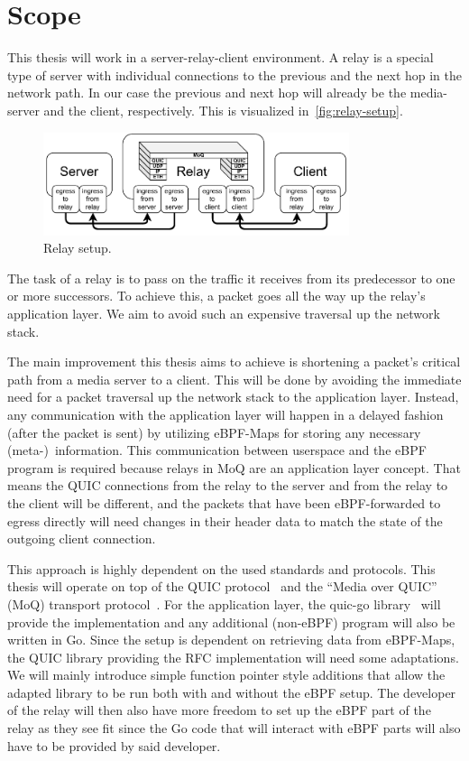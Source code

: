 \section{Scope}\label{sec:scope}

This thesis will work in a server-relay-client environment.
A relay is a special type of server with individual 
connections to the previous and the next hop in the network path.
In our case the previous and next hop will already be the media-server and 
the client, respectively.
This is visualized in~\autoref{fig:relay-setup}.
\vspace{0.5cm}
\begin{figure}[H]
    \centering
    \includegraphics[width=0.8\textwidth]{figures/02_background/general-relay.drawio.pdf}
    \caption[Server-Relay-Client-Setup]{Relay setup.}\label{fig:relay-setup}
\end{figure}
The task of a relay is to pass on the traffic it receives from its predecessor
to one or more successors.
To achieve this, a packet goes all the way up the relay's application layer.
We aim to avoid such an expensive traversal up the network stack.

The main improvement this thesis aims to achieve is shortening a packet's critical path from a media server to a client.
This will be done by avoiding the immediate need for a packet traversal up the network stack to the application layer.
Instead, any communication with the application layer will happen in a delayed fashion (after the packet is sent) by utilizing 
eBPF-Maps for storing any necessary (meta-)~information.
This communication between userspace and the eBPF program is required because relays in MoQ are an application layer concept.
That means the QUIC connections from the relay to the server and from the relay to the client will be different, and the packets that have been eBPF-forwarded to egress directly will need changes in their header data to match the state of the outgoing client connection.  

This approach is highly dependent on the used standards and protocols.
This thesis will operate on top of the QUIC protocol~\parencite{rfc-9000} and the ``Media over QUIC'' (MoQ) 
transport protocol~\parencite{draft-moqtransport}.
For the application layer, the quic-go library~\parencite{quic-go-repo} will provide the implementation and 
any additional (non-eBPF) program will also be written in Go.
Since the setup is dependent on retrieving data from eBPF-Maps, the QUIC library providing the RFC implementation 
will need some adaptations.
We will mainly introduce simple function pointer style additions that allow the adapted library to be run 
both with and without the eBPF setup.
The developer of the relay will then also have more freedom to set up the eBPF part of the relay as they see fit
since the Go code that will interact with eBPF parts will also have to be provided by said developer.

